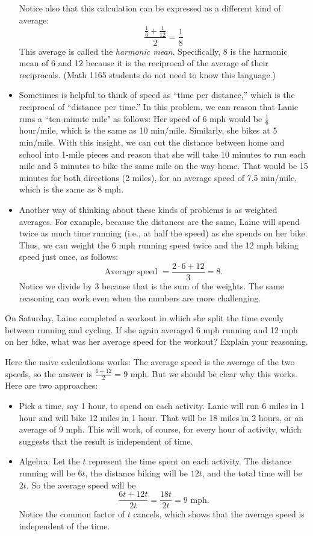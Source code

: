 \begin{teachingnote}
\begin{itemize}
Notice also that this calculation can be expressed as a different kind of average:  $$\frac{\frac{1}{6}+\frac{1}{12}}{2}=\frac{1}{8}$$
This average is called the \emph{harmonic mean}.  Specifically, 8 is the harmonic mean of 6 and 12 because it is the reciprocal of the average of their reciprocals.  (Math 1165 students do not need to know this language.)
\item Sometimes is helpful to think of speed as ``time per distance,'' which is the reciprocal of ``distance per time.''  In this problem, we can reason that Lanie runs a ``ten-minute mile" as follows:  Her speed of 6 mph would be $\frac{1}{6}$ hour/mile, which is the same as 10 min/mile.  Similarly, she bikes at 5 min/mile.  With this insight, we can cut the distance between home and school into 1-mile pieces and reason that she will take 10 minutes to run each mile and 5 minutes to bike the same mile on the way home.  That would be 15 minutes for both directions (2 miles), for an average speed of 7.5 min/mile, which is the same as 8 mph.  
\item Another way of thinking about these kinds of problems is as weighted averages.  For example, because the distances are the same, Laine will spend twice as much time running (i.e., at half the speed) as she spends on her bike.  Thus, we can weight the 6 mph running speed twice and the 12 mph biking speed just once, as follows:  
$$\textrm{Average speed }= \frac{2\cdot6 + 12}{3} = 8.$$
Notice we divide by 3 because that is the sum of the weights.  The same reasoning can work even when the numbers are more challenging.  
\end{itemize}
\end{teachingnote}

\begin{prob}
On Saturday, Laine completed a workout in which she split the time evenly between running and cycling.  If she again averaged 6 mph running and 12 mph on her bike, what was her average speed for the workout?  Explain your reasoning. 
\end{prob}

\begin{teachingnote}
Here the naive calculations works:  The average speed is the average of the two speeds, so the answer is $\frac{6+12}{2}=9$ mph.  But we should be clear why this works.  Here are two approaches: 
\begin{itemize}
\item Pick a time, say 1 hour, to spend on each activity.  Lanie will run 6 miles in 1 hour and will bike 12 miles in 1 hour.  That will be 18 miles in 2 hours, or an average of 9 mph.  This will work, of course, for every hour of activity, which suggests that the result is independent of time.  
\item Algebra:  Let the $t$ represent the time spent on each activity.  The distance running will be $6t$, the distance biking will be $12t$, and the total time will be $2t$.  So the average speed will be $$\frac{6t+12t}{2t}=\frac{18t}{2t}=9 \text{ mph.}$$  
Notice the common factor of $t$ cancels, which shows that the average speed is independent of the time.  
\end{itemize}
\end{teachingnote}

